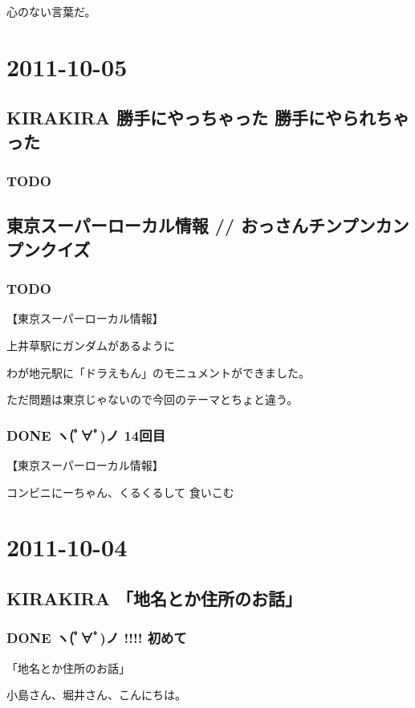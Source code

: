 \documentclass[11pt]{article}
\begin{document}
心のない言葉だ。
\section{2011-10-05}
\label{sec-61}
\subsection{KIRAKIRA 勝手にやっちゃった 勝手にやられちゃった}
\label{sec-61_1}
\subsubsection{\textbf{TODO}}
\label{sec-61_1_1}
\subsection{東京スーパーローカル情報 // おっさんチンプンカンプンクイズ}
\label{sec-61_2}
\subsubsection{\textbf{TODO}}
\label{sec-61_2_1}

【東京スーパーローカル情報】

上井草駅にガンダムがあるように

わが地元駅に「ドラえもん」のモニュメントができました。

ただ問題は東京じゃないので今回のテーマとちょと違う。
\subsubsection{\textbf{DONE} ヽ(ﾟ∀ﾟ)ノ 14回目}
\label{sec-61_2_2}

【東京スーパーローカル情報】

コンビニにーちゃん、くるくるして
食いこむ
\section{2011-10-04}
\label{sec-62}
\subsection{KIRAKIRA 「地名とか住所のお話」}
\label{sec-62_1}
\subsubsection{\textbf{DONE} ヽ(ﾟ∀ﾟ)ノ !!!! 初めて}
\label{sec-62_1_1}

「地名とか住所のお話」

小島さん、堀井さん、こんにちは。
\end{document}
